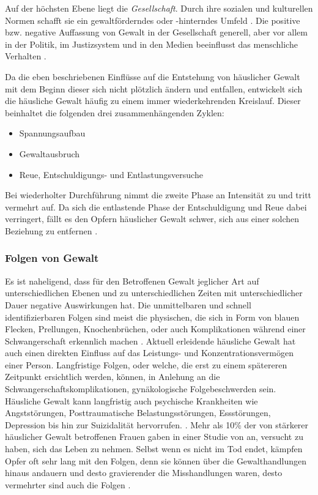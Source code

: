 Auf der höchsten Ebene liegt die \textit{Gesellschaft}. Durch ihre sozialen und kulturellen Normen schafft sie ein gewaltförderndes oder -hinterndes Umfeld \parencite{Ursache_hG_2, Ursache_hG, Gewaltart}. Die positive bzw. negative Auffassung von Gewalt in der Gesellschaft generell, aber vor allem in der Politik, im Justizsystem und in den Medien beeinflusst das menschliche Verhalten \parencite{Ursache_hG_2, Ursache_hG}.  

Da die eben beschriebenen Einflüsse auf die Entstehung von häuslicher Gewalt mit dem Beginn dieser sich nicht plötzlich ändern und entfallen, entwickelt sich die häusliche Gewalt häufig zu einem immer wiederkehrenden Kreislauf. Dieser beinhaltet die folgenden drei zusammenhängenden Zyklen: \\ 

\begin{itemize}
    \item Spannungsaufbau
    \item Gewaltausbruch
    \item Reue, Entschuldigungs- und Entlastungsversuche
\end{itemize}

Bei wiederholter Durchführung nimmt die zweite Phase an Intensität zu und tritt vermehrt auf. Da sich die entlastende Phase der Entschuldigung und Reue dabei verringert, fällt es den Opfern häuslicher Gewalt schwer, sich aus einer solchen Beziehung zu entfernen \parencite{Def_haus_Gewalt}.


\subsubsection{Folgen von Gewalt}     \label{2.1.2.3}
Es ist naheligend, dass für den Betroffenen Gewalt jeglicher Art auf unterschiedlichen Ebenen und zu unterschiedlichen Zeiten mit unterschiedlicher Dauer negative Auswirkungen hat. Die unmittelbaren und schnell identifizierbaren Folgen sind meist die physischen, die sich in Form von blauen Flecken, Prellungen, Knochenbrüchen, oder auch Komplikationen während einer Schwangerschaft erkennlich machen \parencite{Def_Form_Folge_Gewalt, Gewaltart}. Aktuell erleidende häusliche Gewalt hat auch einen direkten Einfluss auf das Leistungs- und Konzentrationsvermögen einer Person. Langfristige Folgen, oder welche, die erst zu einem spätereren Zeitpunkt ersichtlich werden, können, in Anlehung an die Schwangerschaftskomplikationen, gynäkologische Folgebeschwerden sein. Häusliche Gewalt kann langfristig auch psychische Krankheiten wie Angststörungen, Posttraumatische Belastungsstörungen, Essstörungen, Depression bis hin zur Suizidalität hervorrufen. \parencite{Def_Form_Folge_Gewalt, Gewaltart}. Mehr als 10\% der von stärkerer häuslicher Gewalt betroffenen Frauen gaben in einer Studie von \textcite{psy_Folgen_hG} an, versucht zu haben, sich das Leben zu nehmen. Selbst wenn es nicht im Tod endet, kämpfen Opfer oft sehr lang mit den Folgen, denn sie können über die Gewalthandlungen hinaus andauern \parencite{Def_haus_Gewalt} und desto gravierender die Misshandlungen waren, desto vermehrter sind auch die Folgen \parencite{Gewaltart}.

